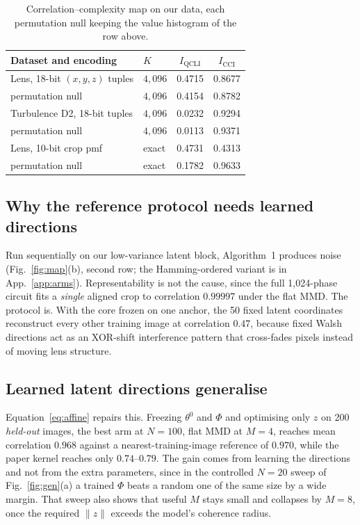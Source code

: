 \documentclass{article}
\newcommand{\qcli}{I_{\mathrm{QCLI}}}
\newcommand{\cci}{I_{\mathrm{CCI}}}
\begin{document}
\begin{table}[tb]
\centering
\caption{Correlation--complexity map on our data, each permutation null keeping the value histogram
of the row above.}
\label{tab:map}
\scriptsize
\begin{tabular}{llcc}
\toprule
Dataset and encoding & $K$ & $\qcli$ & $\cci$ \\
\midrule
Lens, 18-bit $(x,y,z)$ tuples      & $4{,}096$ & 0.4715 & 0.8677 \\
\quad permutation null            & $4{,}096$ & 0.4154 & 0.8782 \\
Turbulence D2, 18-bit tuples       & $4{,}096$ & 0.0232 & 0.9294 \\
\quad permutation null            & $4{,}096$ & 0.0113 & 0.9371 \\
\midrule
Lens, 10-bit crop pmf              & exact     & 0.4731 & 0.4313 \\
\quad permutation null            & exact     & 0.1782 & 0.9633 \\
\bottomrule
\end{tabular}
\end{table}

\subsection{Why the reference protocol needs learned directions}
\label{sec:whyfail}

Run sequentially on our low-variance latent block, Algorithm~1 produces noise
(Fig.~\ref{fig:map}(b), second row; the Hamming-ordered variant is in App.~\ref{app:arms}).
Representability is not the cause, since the full 1{,}024-phase circuit fits a \emph{single} aligned
crop to correlation $0.99997$ under the flat MMD. The protocol is. With the core frozen on one
anchor, the 50 fixed latent coordinates reconstruct every other training image at correlation
$0.47$, because fixed Walsh directions act as an XOR-shift interference pattern that cross-fades
pixels instead of moving lens structure.

\subsection{Learned latent directions generalise}
\label{sec:affine}

Equation~\eqref{eq:affine} repairs this. Freezing $\theta^{0}$ and $\Phi$ and optimising only $z$ on
200 \emph{held-out} images, the best arm at $N{=}100$, flat MMD at $M{=}4$, reaches mean correlation
$0.968$ against a nearest-training-image reference of $0.970$, while the paper kernel reaches only
$0.74$--$0.79$. The gain comes from
learning the directions and not from the extra
parameters, since in the controlled $N{=}20$ sweep of Fig.~\ref{fig:gen}(a) a trained $\Phi$ beats a
random one of the same size by a wide margin. That sweep also shows that useful $M$ stays small and
collapses by $M{=}8$, once the required $\|z\|$ exceeds the model's coherence radius.
\end{document}
